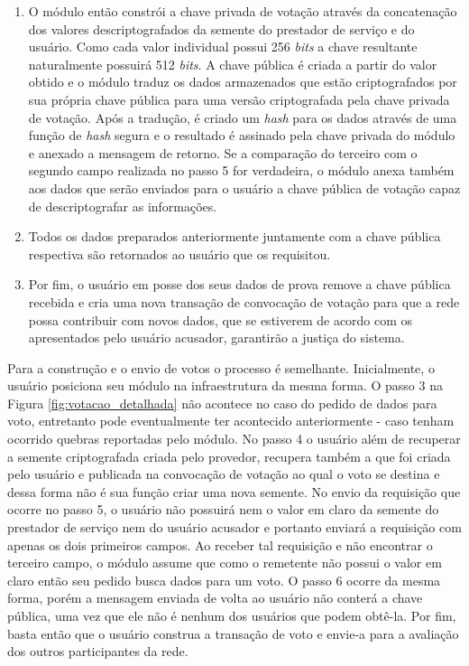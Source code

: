 \begin{enumerate}[label=\textbf{\arabic*})]
    \item O módulo então constrói a chave privada de votação através da concatenação dos valores descriptografados da semente do prestador de serviço e do usuário. Como cada valor individual possui 256 \textit{bits} a chave resultante naturalmente possuirá 512 \textit{bits}. A chave pública é criada a partir do valor obtido e o módulo traduz os dados armazenados que estão criptografados por sua própria chave pública para uma versão criptografada pela chave privada de votação. Após a tradução, é criado um \textit{hash} para os dados através de uma função de \textit{hash} segura e o resultado é assinado pela chave privada do módulo e anexado a mensagem de retorno. Se a comparação do terceiro com o segundo campo realizada no passo 5 for verdadeira, o módulo anexa também aos dados que serão enviados para o usuário a chave pública de votação capaz de descriptografar as informações.
    \item Todos os dados preparados anteriormente juntamente com a chave pública respectiva são retornados ao usuário que os requisitou.
    \item Por fim, o usuário em posse dos seus dados de prova remove a chave pública recebida e cria uma nova transação de convocação de votação para que a rede possa contribuir com novos dados, que se estiverem de acordo com os apresentados pelo usuário acusador, garantirão a justiça do sistema.  
\end{enumerate}

Para a construção e o envio de votos o processo é semelhante. Inicialmente, o usuário posiciona seu módulo na infraestrutura da mesma forma. O passo 3 na Figura \ref{fig:votacao_detalhada} não acontece no caso do pedido de dados para voto, entretanto pode eventualmente ter acontecido anteriormente - caso tenham ocorrido quebras reportadas pelo módulo. No passo 4 o usuário além de recuperar a semente criptografada criada pelo provedor, recupera também a que foi criada pelo usuário e publicada na convocação de votação ao qual o voto se destina e dessa forma não é sua função criar uma nova semente. No envio da requisição que ocorre no passo 5, o usuário não possuirá nem o valor em claro da semente do prestador de serviço nem do usuário acusador e portanto enviará a requisição com apenas os dois primeiros campos. Ao receber tal requisição e não encontrar o terceiro campo, o módulo assume que como o remetente não possui o valor em claro então seu pedido busca dados para um voto. O passo 6 ocorre da mesma forma, porém a mensagem enviada de volta ao usuário não conterá a chave pública, uma vez que ele não é nenhum dos usuários que podem obtê-la. Por fim, basta então que o usuário construa a transação de voto e envie-a para a avaliação dos outros participantes da rede.


